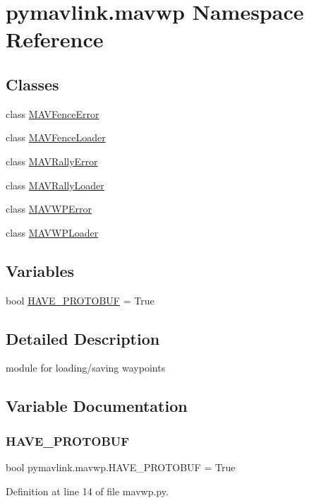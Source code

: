 \hypertarget{namespacepymavlink_1_1mavwp}{}\section{pymavlink.\+mavwp Namespace Reference}
\label{namespacepymavlink_1_1mavwp}
\subsection*{Classes}
\begin{DoxyCompactItemize}
\item 
class \mbox{\hyperlink{classpymavlink_1_1mavwp_1_1MAVFenceError}{M\+A\+V\+Fence\+Error}}
\item 
class \mbox{\hyperlink{classpymavlink_1_1mavwp_1_1MAVFenceLoader}{M\+A\+V\+Fence\+Loader}}
\item 
class \mbox{\hyperlink{classpymavlink_1_1mavwp_1_1MAVRallyError}{M\+A\+V\+Rally\+Error}}
\item 
class \mbox{\hyperlink{classpymavlink_1_1mavwp_1_1MAVRallyLoader}{M\+A\+V\+Rally\+Loader}}
\item 
class \mbox{\hyperlink{classpymavlink_1_1mavwp_1_1MAVWPError}{M\+A\+V\+W\+P\+Error}}
\item 
class \mbox{\hyperlink{classpymavlink_1_1mavwp_1_1MAVWPLoader}{M\+A\+V\+W\+P\+Loader}}
\end{DoxyCompactItemize}
\subsection*{Variables}
\begin{DoxyCompactItemize}
\item 
bool \mbox{\hyperlink{namespacepymavlink_1_1mavwp_a1cbe5647027552fa236516566ea69763}{H\+A\+V\+E\+\_\+\+P\+R\+O\+T\+O\+B\+UF}} = True
\end{DoxyCompactItemize}


\subsection{Detailed Description}
\begin{DoxyVerb}module for loading/saving waypoints
\end{DoxyVerb}
 

\subsection{Variable Documentation}
\mbox{\label{namespacepymavlink_1_1mavwp_a1cbe5647027552fa236516566ea69763}} 
\subsubsection{\texorpdfstring{HAVE\_PROTOBUF}{HAVE\_PROTOBUF}}
{\footnotesize\ttfamily bool pymavlink.\+mavwp.\+H\+A\+V\+E\+\_\+\+P\+R\+O\+T\+O\+B\+UF = True}



Definition at line 14 of file mavwp.\+py.

